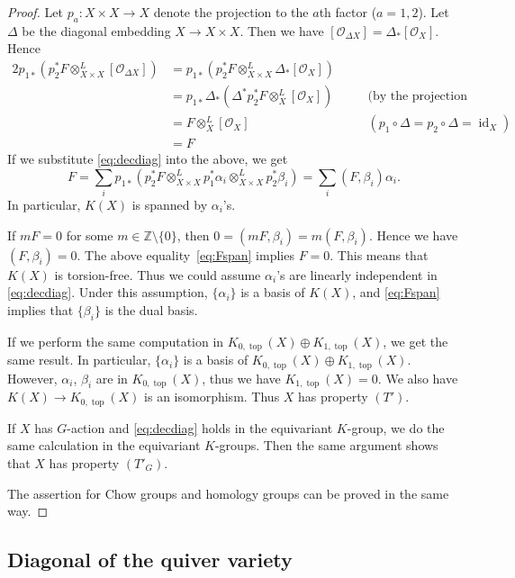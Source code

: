 \documentclass[12pt]{amsart}
\theoremstyle{definition}
\theoremstyle{remark}
\numberwithin{equation}{subsection}
\newcommand{\id}{\operatorname{id}}
\newcommand{\shfO}{\mathcal O}
\newcommand{\Kztop}{K_{0,\operatorname{top}}}
\newcommand{\Kotop}{K_{1,\operatorname{top}}}
\begin{document}
\begin{proof}
Let $p_a\colon X\times X\to X$ denote the projection to the $a$th factor
($a= 1,2$). Let $\Delta$ be the diagonal embedding $X \to X\times
X$. Then we have $[\shfO_{\Delta X}] = \Delta_* [\shfO_X]$. Hence
\begin{alignat*}{2}
   p_{1*}\left(p_2^* F\otimes^L_{X\times X}
    [\shfO_{\Delta X}]\right)
  & = p_{1*}\left(p_2^* F\otimes^L_{X\times X}
    \Delta_* [\shfO_{X}]\right) &&\\
  &= p_{1*}\Delta_* \left( \Delta^* p_2^* F\otimes^L_X
    [\shfO_X]\right)
  &\quad &\text{(by the projection formula)}\\
  &= F\otimes^L_X [\shfO_X] &&(p_1\circ\Delta = p_2\circ\Delta =
    \id_X)\\
  &=F&&
\end{alignat*}
If we substitute \eqref{eq:decdiag} into the above, we get
\begin{equation}\label{eq:Fspan}
  F = \sum_i p_{1*}\left(p_2^* F\otimes^L_{X\times X}
    p_1^*\alpha_i \otimes^L_{X\times X} p_2^*\beta_i\right)
    = \sum_i (F,\beta_i) \alpha_i.
\end{equation}
In particular, $K(X)$ is spanned by $\alpha_i$'s.

If $mF = 0$ for some $m\in\mathbb Z\setminus\{0\}$, then
$0 = (mF, \beta_i) = m(F,\beta_i)$. Hence we have $(F,\beta_i) =
0$. The above equality~\eqref{eq:Fspan} implies $F = 0$. This means
that $K(X)$ is torsion-free. Thus we could assume $\alpha_i$'s are
linearly independent in \eqref{eq:decdiag}. Under this assumption,
$\{\alpha_i\}$ is a basis of $K(X)$, and \eqref{eq:Fspan} implies that 
$\{ \beta_i \}$ is the dual basis.

If we perform the same computation in $\Kztop(X)\oplus\Kotop(X)$, we
get the same result.
%
In particular, $\{ \alpha_i \}$ is a basis of
$\Kztop(X)\oplus\Kotop(X)$. However, $\alpha_i$, $\beta_i$ are in
$\Kztop(X)$, thus we have $\Kotop(X)= 0$. We also have $K(X)\to
\Kztop(X)$ is an isomorphism. Thus $X$ has property $(T')$.

If $X$ has $G$-action and \eqref{eq:decdiag} holds in the equivariant
$K$-group, we do the same calculation in the equivariant
$K$-groups. Then the same argument shows that $X$ has property
$(T'_G)$.

The assertion for Chow groups and homology groups can be proved
in the same way.
\end{proof}

\subsection{Diagonal of the quiver variety}\label{subsec:diagquiver}
\end{document}
